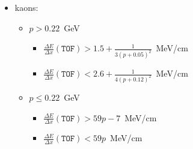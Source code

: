 \begin{itemize}
\begin{itemize}
\begin{itemize}
        \end{itemize}
    \end{itemize}
    \item[] kaons:
    \begin{itemize}
        \item[] $p > 0.22$~GeV
        \begin{itemize}
            \item[] $\frac{\Delta E}{\Delta x}(\mathtt{TOF}) > 1.5 + \frac{1}{ 3 (p + 0.05)^2}$~MeV/cm
            \item[] $\frac{\Delta E}{\Delta x}(\mathtt{TOF}) < 2.6 + \frac{1}{ 4 (p + 0.12)^2}$~MeV/cm
        \end{itemize}
        \item[] $p \leq 0.22$~GeV
        \begin{itemize}
            \item[] $\frac{\Delta E}{\Delta x}(\mathtt{TOF}) > 59 p - 7$~MeV/cm
            \item[] $\frac{\Delta E}{\Delta x}(\mathtt{TOF}) < 59 p$~MeV/cm
        \end{itemize}
    \end{itemize}
\end{itemize}
